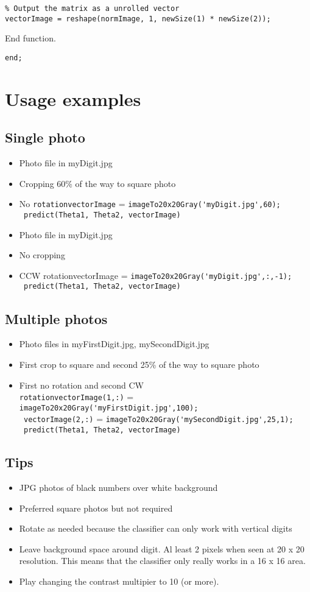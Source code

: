 \begin{verbatim}
% Output the matrix as a unrolled vector
vectorImage = reshape(normImage, 1, newSize(1) * newSize(2));
\end{verbatim}
End function.

\verb|end;|

\section{Usage examples}
\subsection{Single photo}
\begin{itemize}
\item Photo file in myDigit.jpg
\item Cropping 60\% of the way to square photo
\item No \verb|rotationvectorImage| = \verb|imageTo20x20Gray('myDigit.jpg',60);|\\\verb| predict(Theta1, Theta2, vectorImage)|
\item Photo file in myDigit.jpg
\item No cropping
\item CCW rotationvectorImage = \verb|imageTo20x20Gray('myDigit.jpg',:,-1);|\\\verb| predict(Theta1, Theta2, vectorImage)|
\end{itemize}
\subsection{Multiple photos}
\begin{itemize}
\item Photo files in myFirstDigit.jpg, mySecondDigit.jpg
\item First crop to square and second 25\% of the way to square photo
\item First no rotation and second CW \\
\verb|rotationvectorImage(1,:)| = \verb|imageTo20x20Gray('myFirstDigit.jpg',100);|\\
\verb| vectorImage(2,:)| = \verb|imageTo20x20Gray('mySecondDigit.jpg',25,1);|\\\verb| predict(Theta1, Theta2, vectorImage)|
\end{itemize}

\subsection{Tips}
\begin{itemize}
\item JPG photos of black numbers over white background
\item Preferred square photos but not required
\item Rotate as needed because the classifier can only work with vertical digits
\item Leave background space around digit. Al least 2 pixels when seen at 20 x 20 resolution. This means that the classifier only really works in a 16 x 16 area.
\item Play changing the contrast multipier to 10 (or more).
\end{itemize}
